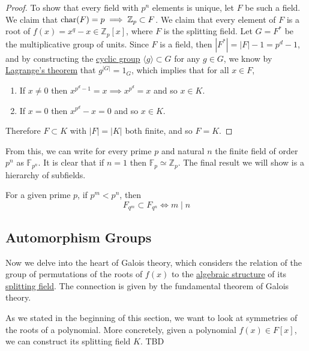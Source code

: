 \begin{proof}
    To show that every field with $p^n$ elements is unique, let $F$ be such a field. We claim that $\operatorname{char}(F) = p \implies \mathbb{Z}_p \subset F$. We claim that every element of $F$ is a root of $f(x) = x^q - x \in \mathbb{Z}_p [x]$, where $F$ is the splitting field. Let $G = F^\ast$ be the multiplicative group of units. Since $F$ is a field, then $|F^\ast| = |F| - 1 = p^d - 1$, and by constructing the \hyperref[def:cyclic-group]{cyclic group} $\langle g \rangle \subset G$ for any $g \in G$, we know by \hyperref[thm:lagranges-theorem]{Lagrange's theorem} that $g^{|G|} = 1_G$, which implies that for all $x \in F$, 
    \begin{enumerate}
      \item If $x \neq 0$ then $x^{p^d - 1} = x \implies x^{p^d} = x$ and so $x \in K$. 
      \item If $x = 0$ then $x^{p^d} - x = 0$ and so $x \in K$. 
    \end{enumerate}
    Therefore $F \subset K$ with $|F| = |K|$ both finite, and so $F = K$. 
  \end{proof} 

  From this, we can write for every prime $p$ and natural $n$ the finite field of order $p^n$ as $\mathbb{F}_{p^n}$. It is clear that if $n = 1$ then $\mathbb{F}_p \simeq \mathbb{Z}_p$. The final result we will show is a hierarchy of subfields. 

  \begin{theorem}
    \label{thm:hierarchy-of-fields}
    For a given prime $p$, if $p^m < p^n$, then 
    \begin{equation}
      F_{q^m} \subset F_{q^n} \iff m \mid n
    \end{equation}
  \end{theorem}

\subsection{Automorphism Groups} 

  Now we delve into the heart of Galois theory, which considers the relation of the group of permutations of the roots of $f(x)$ to the \hyperref[def:algebraic-structure]{algebraic structure} of its \hyperref[def:splitting-field]{splitting field}. The connection is given by the fundamental theorem of Galois theory. 

  As we stated in the beginning of this section, we want to look at symmetries of the roots of a polynomial. More concretely, given a polynomial $f(x) \in F[x]$, we can construct its splitting field $K$. TBD

